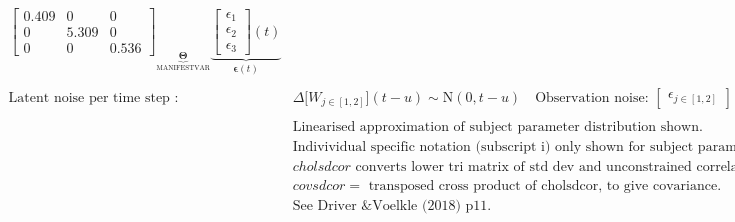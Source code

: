 \documentclass[a4paper]{article}
\newcommand{\vect}[1]{\boldsymbol{\mathbf{#1}}}
\begin{document}
\begin{footnotesize}
\begin{align*}
{\begin{bmatrix}
0.409 & 0 & 0\\ 
0 & 5.309 & 0\\ 
0 & 0 & 0.536
\end{bmatrix}  
              }_{\underbrace{\vect{\Theta}}_\textrm{MANIFESTVAR}}
              \underbrace{
          \begin{bmatrix}
\epsilon_{1}\\ 
\epsilon_{2}\\ 
\epsilon_{3}
\end{bmatrix} 
          (t)}_{\vect{\epsilon}(t)} \\ \\
                \textrm{Latent noise per time step : }
          &\Delta \big[W_{j \in [1,2]}\big](t-u)   \sim  \mathrm{N}(0,t-u) \quad
              \textrm{Observation noise: }
            \begin{bmatrix}
\epsilon_{j \in [1,2]}
\end{bmatrix} 
            (t) \sim  \mathrm{N}(0,1) \\ \\&\textrm{Linearised approximation of subject parameter distribution shown.}\\
            &\textrm{Indivividual specific notation (subscript i) only shown for subject parameter distribution -- pop. means shown elsewhere.} \\
&cholsdcor\textrm{ converts lower tri matrix of std dev and unconstrained correlation to Cholesky factor covariance.} \\
&covsdcor =\textrm{ transposed cross product of cholsdcor, to give covariance.} \\
&\textrm{See Driver \& Voelkle (2018) p11.}
      \end{align*}
      \end{footnotesize}
      
\end{document}
